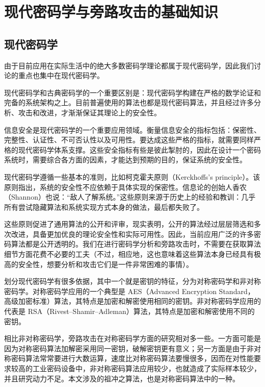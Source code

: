 
\chapter{现代密码学与旁路攻击的基础知识}

\label{chap:crypto}

\section{现代密码学} %

由于目前应用在实际生活中的绝大多数密码学理论都属于现代密码学，因此我们讨论的重点也集中在现代密码学。

现代密码学和古典密码学的一个重要区别是：现代密码学构建在严格的数学论证和完备的系统架构之上。目前普遍使用的算法也都是现代密码算法，并且经过许多分析、攻击和改进，才渐渐保证其理论上的安全性。 \cite{cryptography_foundations}

信息安全是现代密码学的一个重要应用领域。衡量信息安全的指标包括：保密性、完整性、认证性、不可否认性以及可用性。要达成这些严格的指标，就需要同样严格的现代密码学体系支撑。这些安全指标有些是彼此掣肘的，因此在设计一个密码系统时，需要综合各方面的因素，才能达到预期的目的，保证系统的安全性。

现代密码学遵循一些基本的准则，比如柯克霍夫原则（Kerckhoffs's principle）。该原则指出，系统的安全性不应依赖于具体实现的保密性。信息论的创始人香农（Shannon）也说：“敌人了解系统。”这些原则来源于历史上的经验和教训：几乎所有尝试隐藏算法和系统实现方式本身的做法，最后都失败了。

这些原则促进了通用算法的公开和评审，现实表明，公开的算法经过层层筛选和多次改进，具备更加优良的理论安全性和实际可用性。因此，当前应用广泛的许多密码算法都是公开透明的。我们在进行密码学分析和旁路攻击时，不需要在获取算法细节方面花费不必要的工夫（不过，相应地，这也意味着这些算法本身已经具有极高的安全性，想要分析和攻击它们是一件非常困难的事情）。 \cite{cryptography_basic}

划分现代密码学有很多依据，其中一个就是密钥的特征，分为对称密码学和非对称密码学。对称密码学应用的一个典型是 AES（Advanced Encryption Standard，高级加密标准）算法，其特点是加密和解密使用相同的密钥。非对称密码学应用的代表是 RSA（Rivest–Shamir–Adleman）算法，其特点是加密和解密使用不同的密钥。\cite{modern_cryptography}

相比非对称密码学，旁路攻击在对称密码学方面的研究相对多一些。一方面可能是因为对称密码算法加解密采用同一密钥，破解密钥更有意义；另一方面是由于非对称密码算法常常要进行大数运算，速度比对称密码算法要慢很多，因而在对性能要求较高的工业密码设备中，非对称密码算法应用较少，也就造成了实际样本较少，并且研究动力不足。本文涉及的祖冲之算法，也是对称密码算法中的一种。

